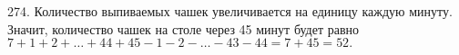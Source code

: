 274. Количество выпиваемых чашек увеличивается на единицу каждую минуту. Значит, количество чашек на столе через 45 минут будет равно $7+1+2+\ldots+44+45-1-2-\ldots-43-44=7+45=52.$\\
